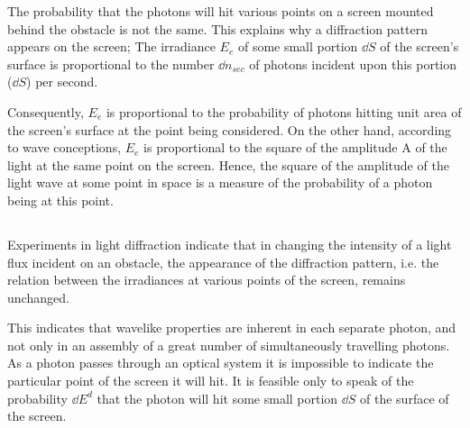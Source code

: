 The probability that the photons will hit various points on a screen mounted behind the obstacle is not the same. This explains why a diffraction pattern appears on the screen; The
irradiance $E_{e}$  of some small portion $\dd S$ of the screen's surface is proportional to the number $\dd n_{sec}$ of photons incident upon this portion ($\dd S$) per second. 

Consequently, $E_{e}$ is proportional to the probability of photons hitting unit area of the screen's surface at the point being considered. On the other hand, according to wave conceptions, $E_{e}$ is proportional to the square of the amplitude A of the light at the same point on the screen. Hence, the square of the amplitude of the light wave at some point in space is a measure of the probability of a photon
being at this point.

\subsection{}\label{37.4.4} Experiments in light diffraction indicate that in changing the intensity of a light flux incident on an obstacle, the appearance of the diffraction pattern, i.e. the relation between the irradiances at various points of the screen, remains unchanged.

This indicates that wavelike properties are inherent in
each separate photon, and not only in an assembly of a great number of simultaneously travelling photons. As a photon passes through an optical system it is impossible to indicate the particular point of the screen it will hit. It is feasible only to speak of the probability $\dd E^{d}$ that the photon will hit some small portion $\dd S$ of the surface of the screen.

